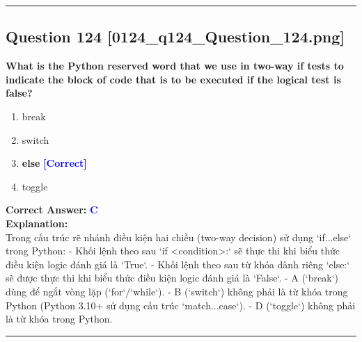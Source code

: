 \documentclass[11pt,a4paper]{article}
\begin{document}
\vspace{0.8cm}
\hrule
\vspace{0.5cm}

\begin{minipage}{\textwidth}
\subsection*{Question 124 \quad \footnotesize{[0124_q124_Question_124.png]}}
\noindent \textbf{What is the Python reserved word that we use in two-way if tests to indicate the block of code that is to be executed if the logical test is false?}

\begin{enumerate}[label=\Alph*.]
    \item break
    \item switch
    \item \textbf{else} \hfill \textcolor{blue}{\textbf{[Correct]}}
    \item toggle
\end{enumerate}

\noindent \textbf{Correct Answer:} \textcolor{blue}{\textbf{C}} \\[4pt]
\noindent \textbf{Explanation:}\\
Trong cấu trúc rẽ nhánh điều kiện hai chiều (two-way decision) sử dụng `if...else` trong Python:\newline
- Khối lệnh theo sau `if <condition>:` sẽ thực thi khi biểu thức điều kiện logic đánh giá là `True`.\newline
- Khối lệnh theo sau từ khóa dành riêng `else:` sẽ được thực thi khi biểu thức điều kiện logic đánh giá là `False`.\newline
- A (`break`) dùng để ngắt vòng lặp (`for`/`while`).\newline
- B (`switch`) không phải là từ khóa trong Python (Python 3.10+ sử dụng cấu trúc `match...case`).\newline
- D (`toggle`) không phải là từ khóa trong Python.
\end{minipage}
\vspace{0.8cm}
\hrule
\vspace{0.5cm}
\end{document}
